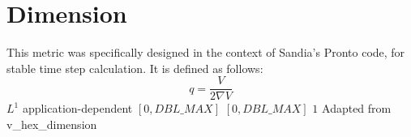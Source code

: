 \section{Dimension} 

This metric was specifically designed in the context of
Sandia's \textsf{Pronto} code, for stable time step calculation. It is
defined as follows:
\[
q = \frac{V}{2\nabla{V}}
\]
%
{$L^1$}%
{application-dependent}%
{$[0,DBL\_MAX]$}%
{$[0,DBL\_MAX]$}%
{$1$}%
{Adapted from \cite{tf:89}}%
{v\_hex\_dimension}%
